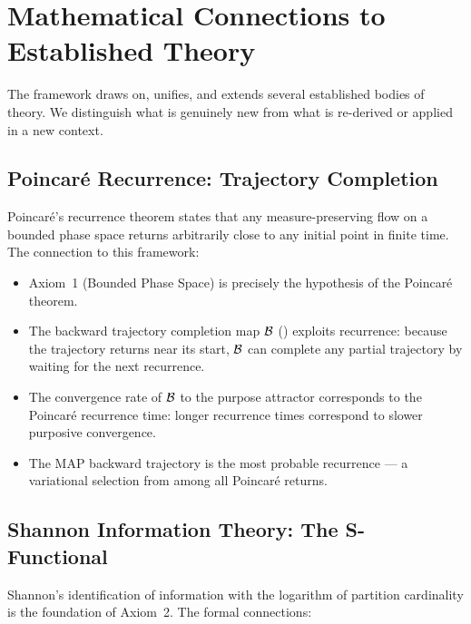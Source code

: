\section{Mathematical Connections to Established Theory}
\label{sec:connections}

The framework draws on, unifies, and extends several established bodies of
theory.  We distinguish what is genuinely new from what is re-derived or
applied in a new context.

\subsection{Poincaré Recurrence: Trajectory Completion}

Poincaré's recurrence theorem \citep{Poincare1892} states that any measure-preserving
flow on a bounded phase space returns arbitrarily close to any initial point
in finite time.  The connection to this framework:

\begin{itemize}[leftmargin=2em]
  \item Axiom~1 (Bounded Phase Space) is precisely the hypothesis of the
    Poincaré theorem.
  \item The backward trajectory completion map $\mathcal{B}$ ()
    exploits recurrence: because the trajectory returns near its start, $\mathcal{B}$
    can complete any partial trajectory by waiting for the next recurrence.
  \item The convergence rate of $\mathcal{B}$ to the purpose attractor corresponds
    to the Poincaré recurrence time: longer recurrence times correspond to
    slower purposive convergence.
  \item The MAP backward trajectory is the most probable recurrence — a
    variational selection from among all Poincaré returns.
\end{itemize}

\subsection{Shannon Information Theory: The S-Functional}

Shannon's identification of information with the logarithm of partition
cardinality \citep{Shannon1948} is the foundation of Axiom~2.  The formal
connections:


